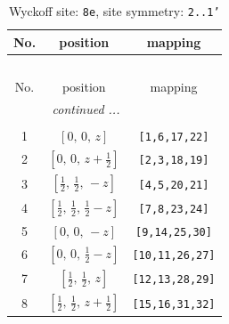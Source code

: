 \documentclass[fleqn,8pt]{jsarticle}
\begin{document}
\renewcommand{\arraystretch}{1.2}
\begin{longtable}{ccc}
\caption{Wyckoff site: {\tt 8e}, site symmetry: {\tt 2..1'}}
 \\
 \hline \hline
No. & position & mapping \\ \hline \endfirsthead

\multicolumn{2}{l}{\tablename\ \thetable{}} \\
 \hline \hline
No. & position & mapping \\ \hline \endhead

 \hline \hline
\multicolumn{2}{r}{\footnotesize\it continued ...} \\ \endfoot

 \hline \hline
\multicolumn{2}{r}{} \\ \endlastfoot

1 & $\left[ 0,\, 0,\, z \right]$ & {\tt [1,6,17,22]} \\ \hline
2 & $\left[ 0,\, 0,\, z + \frac{1}{2} \right]$ & {\tt [2,3,18,19]} \\ \hline
3 & $\left[ \frac{1}{2},\, \frac{1}{2},\, - z \right]$ & {\tt [4,5,20,21]} \\ \hline
4 & $\left[ \frac{1}{2},\, \frac{1}{2},\, \frac{1}{2} - z \right]$ & {\tt [7,8,23,24]} \\ \hline
5 & $\left[ 0,\, 0,\, - z \right]$ & {\tt [9,14,25,30]} \\ \hline
6 & $\left[ 0,\, 0,\, \frac{1}{2} - z \right]$ & {\tt [10,11,26,27]} \\ \hline
7 & $\left[ \frac{1}{2},\, \frac{1}{2},\, z \right]$ & {\tt [12,13,28,29]} \\ \hline
8 & $\left[ \frac{1}{2},\, \frac{1}{2},\, z + \frac{1}{2} \right]$ & {\tt [15,16,31,32]} \\
\end{longtable}
\renewcommand{\arraystretch}{1.2}
\end{document}
